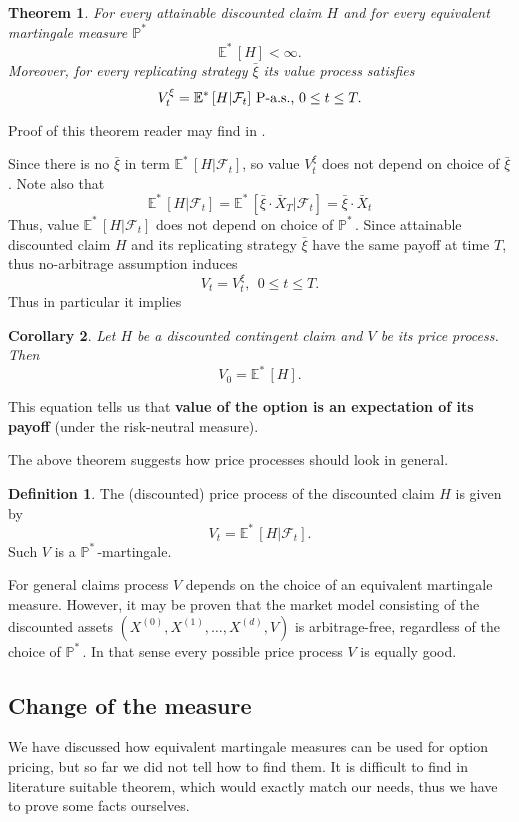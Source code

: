 \documentclass[a4paper,12pt, oneside]{book}
\newtheorem{thm}{Theorem}[chapter]
\newtheorem{coro}[thm]{Corollary}
\theoremstyle{definition}
\newtheorem{mydef}{Definition}[chapter]
\theoremstyle{remark}
\def\Em{{\mathbb{E}^*}\,}
\def\Pm{{\mathbb{P}}^*\,}
\def\Xa{\bar{X}}
\def\xia{\bar{\xi}}
\begin{document}
\begin{thm}
 For every attainable discounted claim $H$ and for every equivalent martingale measure $\Pm$
 \[ \Em [H] < \infty. \]
 Moreover, for every replicating strategy $\xia$ its value process satisfies
 \begin{equation}
  V^\xi_t = \Em[H | \mathcal{F}_t] \hbox{ P-a.s., } 0 \leq t \leq T .
 \end{equation}
\end{thm}
Proof of this theorem reader may find in \cite{follmer}.

Since there is no $\xia$ in term $\Em[H | \mathcal{F}_t]$, so value $V^\xi_t$ does not depend on choice of $\xia$. Note also that
\begin{equation*}
 \Em[H | \mathcal{F}_t]  = \Em[\xia \cdot \Xa_T | \mathcal{F}_t]  = \xia \cdot \Xa_t
\end{equation*}
Thus, value $\Em[H | \mathcal{F}_t]$ does not depend on choice of $\Pm$. 
Since attainable discounted claim $H$ and its replicating strategy $\xia$ have the same payoff at time $T$, thus no-arbitrage assumption induces
\[ V_t = V^\xi_t,\ \ 0 \leq t \leq T. \]
Thus in particular it implies
\begin{coro}
\label{coro:price_mth}
Let $H$ be a discounted contingent claim and $V$ be its price process. Then
\begin{equation}
 \label{eq:price_mtg}
 V_0 = \Em[H].
\end{equation}
\end{coro}
\noindent This equation tells us that \textbf{value of the option is an expectation of its payoff} (under the risk-neutral measure).

The above theorem suggests how price processes should look in general.
\begin{mydef}
 The (discounted) price process of the discounted claim $H$ is given by
 \begin{equation*}
  V_t = \Em[H | \mathcal{F}_t].
 \end{equation*}
 Such $V$ is a $\Pm$-martingale.
\end{mydef}
For general claims process $V$ depends on the choice of an equivalent martingale measure. However, it may be proven that the market model consisting of the discounted assets $(X^{(0)}, X^{(1)},\ldots,X^{(d)}, V)$ is arbitrage-free, regardless of the choice of $\Pm$. In that sense every possible price process $V$ is equally good.

\subsection*{Change of the measure}
We have discussed how equivalent martingale measures can be used for option pricing, but so far we did not tell how to find them. It is difficult to find in literature suitable theorem, which would exactly match our needs, thus we have to prove some facts ourselves.
\end{document}
